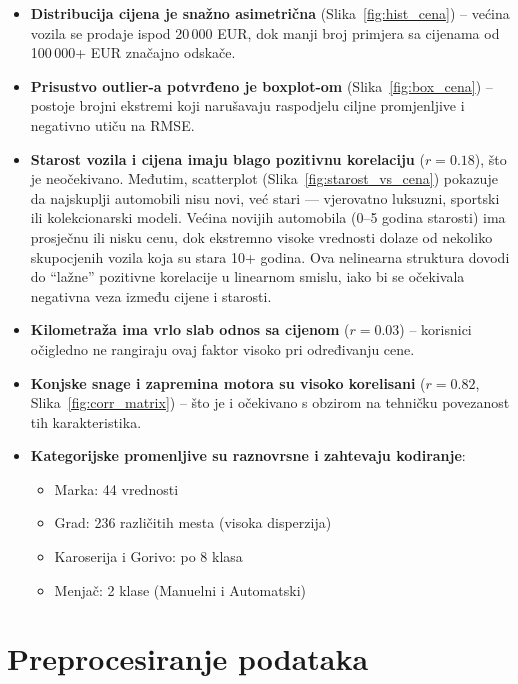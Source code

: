 \documentclass[a4paper,12pt]{article}
\begin{document}
\begin{itemize}
    \item \textbf{Distribucija cijena je snažno asimetrična} (Slika~\ref{fig:hist_cena}) – većina vozila se prodaje ispod 20\,000 EUR, dok manji broj primjera sa cijenama od 100\,000+ EUR značajno odskače.
    
    \item \textbf{Prisustvo outlier-a potvrđeno je boxplot-om} (Slika~\ref{fig:box_cena}) – postoje brojni ekstremi koji narušavaju raspodjelu ciljne promjenljive i negativno utiču na RMSE.

    \item \textbf{Starost vozila i cijena imaju blago pozitivnu korelaciju} ($r = 0.18$), što je neočekivano. Međutim, scatterplot (Slika~\ref{fig:starost_vs_cena}) pokazuje da najskuplji automobili nisu novi, već stari — vjerovatno luksuzni, sportski ili kolekcionarski modeli. Većina novijih automobila (0–5 godina starosti) ima prosječnu ili nisku cenu, dok ekstremno visoke vrednosti dolaze od nekoliko skupocjenih vozila koja su stara 10+ godina. Ova nelinearna struktura dovodi do “lažne” pozitivne korelacije u linearnom smislu, iako bi se očekivala negativna veza između cijene i starosti.

    \item \textbf{Kilometraža ima vrlo slab odnos sa cijenom} ($r = 0.03$) – korisnici očigledno ne rangiraju ovaj faktor visoko pri određivanju cene.

    \item \textbf{Konjske snage i zapremina motora su visoko korelisani} ($r = 0.82$, Slika~\ref{fig:corr_matrix}) – što je i očekivano s obzirom na tehničku povezanost tih karakteristika.

    \item \textbf{Kategorijske promenljive su raznovrsne i zahtevaju kodiranje}:
    \begin{itemize}
        \item Marka: 44 vrednosti
        \item Grad: 236 različitih mesta (visoka disperzija)
        \item Karoserija i Gorivo: po 8 klasa
        \item Menjač: 2 klase (Manuelni i Automatski)
    \end{itemize}
\end{itemize}

\section{Preprocesiranje podataka}
\end{document}

